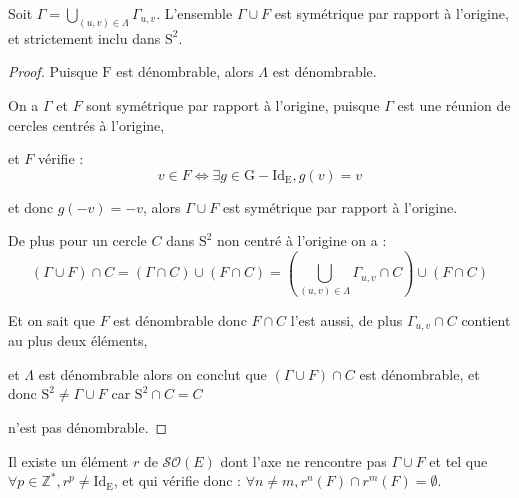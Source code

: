 \begin{lemma}\label{lemme16}
  \hfill

    Soit $\Gamma = \underset{(u,v)\in \Lambda}{\bigcup}\Gamma_{u, v}$. L'ensemble $\Gamma \cup F$ est symétrique par rapport à l'origine, et strictement inclu dans $\mathrm{S}^2$.
\end{lemma}
\begin{proof}
  \hfill

  Puisque $\mathrm{F}$ est dénombrable, alors $\Lambda$ est dénombrable.\par
  On a $\Gamma$ et $F$ sont symétrique par rapport à l'origine, puisque $\Gamma$ est une réunion de cercles centrés à l'origine,\par et $F$ vérifie : $$v \in F \Leftrightarrow \exists g \in \mathrm{G}-\mathrm{Id_E}, g(v)=v$$\par et donc $g(-v)=-v$,
  alors $\Gamma \cup F$ est symétrique par rapport à l'origine.\par
  De plus pour un cercle $C$ dans $\mathrm{S}^2$ non centré à l'origine on a : $$\left(\Gamma \cup F\right) \cap C=\left(\Gamma\cap C\right)\cup \left(F\cap C\right)= \left(\underset{\left(u,v\right)\in \Lambda}{\bigcup}\Gamma_{u, v}\cap C\right) \cup \left(F\cap C\right)$$\par
  Et on sait que $F$ est dénombrable donc $F\cap C$ l'est aussi, de plus $\Gamma_{u, v}\cap C$ contient au plus deux éléments, \par et $\Lambda$ est dénombrable alors on conclut que $(\Gamma \cup F)\cap C$ est dénombrable, et donc $\mathrm{S}^2 \ne \Gamma \cup F$ car $\mathrm{S}^2\cap C = C$\par n'est pas dénombrable.\par
\end{proof}
\begin{lemma}\label{lemme17}
  \hfill

  Il existe un élément $r$ de $\mathcal{SO}(E)$ dont l'axe ne rencontre pas $\Gamma \cup F$ et tel que $\forall p \in \mathbb{Z}^*, r^p \neq \mathrm{Id_E}$, et qui vérifie donc : $\forall n\neq m, r^n(F)\cap r^m(F) = \emptyset$.
\end{lemma}
